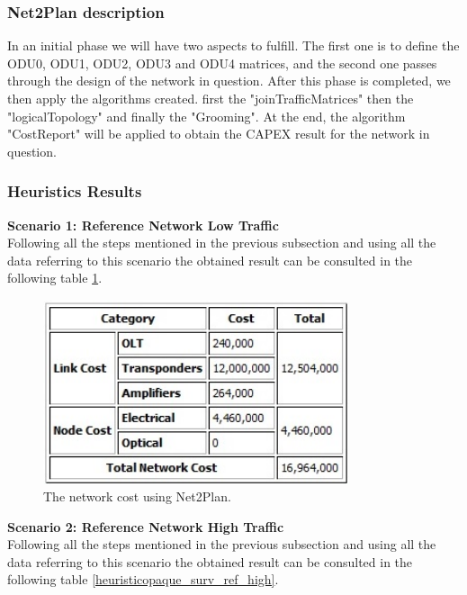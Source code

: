 \subsubsection{Net2Plan description}

In an initial phase we will have two aspects to fulfill. The first one is to define the ODU0, ODU1, ODU2, ODU3 and ODU4 matrices, and the second one passes through the design of the network in question.
After this phase is completed, we then apply the algorithms created. first the "joinTrafficMatrices" then the "logicalTopology" and finally the "Grooming".
At the end, the algorithm "CostReport" will be applied to obtain the CAPEX result for the network in question.

\subsubsection{Heuristics Results}

\textbf{Scenario 1: Reference Network Low Traffic}\\

Following all the steps mentioned in the previous subsection and using all the data referring to this scenario the obtained result can be consulted in the following table \ref{heuristicopaque_surv_ref_low}.

\begin{figure}[h!]
\centering
\includegraphics[width=9cm]{sdf/opaque/figures/heuristic_opaque_surv_ref_low}
\caption{The network cost using Net2Plan.}
\label{heuristicopaque_surv_ref_low}
\end{figure}


\textbf{Scenario 2: Reference Network High Traffic}\\

Following all the steps mentioned in the previous subsection and using all the data referring to this scenario the obtained result can be consulted in the following table \ref{heuristicopaque_surv_ref_high}.

